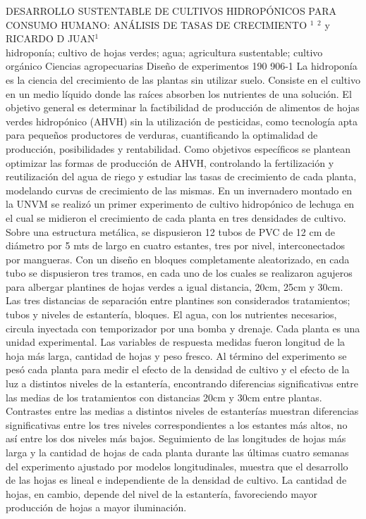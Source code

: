 \A
{DESARROLLO SUSTENTABLE DE CULTIVOS HIDROPÓNICOS PARA CONSUMO HUMANO: ANÁLISIS DE TASAS DE CRECIMIENTO}
{$^1$ $^2$ y RICARDO D JUAN$^1$}
{
\\}
{hidroponía; cultivo de hojas verdes; agua; agricultura sustentable; cultivo orgánico} 
 {Ciencias agropecuarias} 
 {Diseño de experimentos} 
 {190} 
 {906-1}
{La hidroponía es la ciencia del crecimiento de las plantas sin utilizar suelo. Consiste en el cultivo en un medio líquido donde las raíces absorben los nutrientes de una solución. El objetivo general es determinar la factibilidad de producción de alimentos de hojas verdes hidropónico (AHVH) sin la utilización de pesticidas, como tecnología apta para pequeños productores de verduras, cuantificando la optimalidad de producción, posibilidades y rentabilidad. Como objetivos específicos se plantean optimizar las formas de producción de AHVH, controlando la fertilización y reutilización del agua de riego y estudiar las tasas de crecimiento de cada planta, modelando curvas de crecimiento de las mismas. En un invernadero montado en la UNVM se realizó un primer experimento de cultivo hidropónico de lechuga en el cual se midieron el crecimiento de cada planta en tres densidades de cultivo. Sobre una estructura metálica, se dispusieron 12 tubos de PVC de 12 cm de diámetro por 5 mts de largo en cuatro estantes, tres por nivel, interconectados por mangueras. Con un diseño en bloques completamente aleatorizado, en cada tubo se dispusieron tres tramos, en cada uno de los cuales se realizaron agujeros para albergar plantines de hojas verdes a igual distancia, 20cm, 25cm y 30cm. Las tres distancias de separación entre plantines son considerados tratamientos; tubos y niveles de estantería, bloques. El agua, con los nutrientes necesarios, circula inyectada con temporizador por una bomba y drenaje.  Cada planta es una unidad experimental. Las variables de respuesta medidas fueron longitud de la hoja más larga, cantidad de hojas y peso fresco. Al término del experimento se pesó cada planta para medir el efecto de la densidad de cultivo y el efecto de la luz a distintos niveles  de la estantería, encontrando diferencias significativas entre las medias de los tratamientos con distancias 20cm y 30cm entre plantas. Contrastes entre las medias a distintos niveles de estanterías muestran diferencias significativas entre los tres niveles correspondientes a los estantes más altos, no así entre los dos niveles más bajos. Seguimiento de las longitudes de hojas más larga y la cantidad de hojas  de cada planta durante las últimas cuatro semanas del experimento ajustado por modelos longitudinales, muestra que el desarrollo de las hojas es lineal e independiente de la densidad de cultivo. La cantidad de hojas, en cambio, depende del nivel de la estantería, favoreciendo mayor producción de hojas a mayor iluminación.}